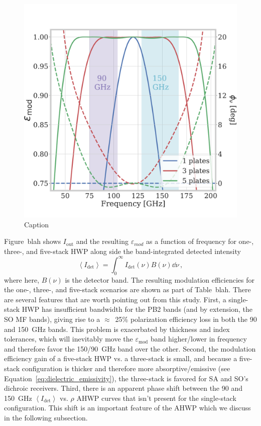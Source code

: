 \begin{figure}[!t]
    \centering
    \includegraphics[width=0.7\linewidth, trim=0cm 1cm 0cm 3cm, clip]{PolarizationModulation/Figures/one_three_five_plates_modulation_efficiency_phase.pdf}
    \caption{Caption}
    \label{fig:my_label}
\end{figure}

Figure~blah shows $I_{\mathrm{out}}$ and the resulting $\varepsilon_{mod}$ as a function of frequency for one-, three-, and five-stack HWP along side the band-integrated detected intensity
\begin{equation}
    \left< I_{\mathrm{det}} \right> = \int_{0}^{\infty} I_{\mathrm{det}}(\nu) B(\nu) \dd \nu \, ,
\end{equation}
where here, $B(\nu)$ is the detector band. The resulting modulation efficiencies for the one-, three-, and five-stack scenarios are shown as part of Table~blah. There are several features that are worth pointing out from this study. First, a single-stack HWP has insufficient bandwidth for the PB2 bands (and by extension, the SO MF bands), giving rise to a $\approx$~25\% polarization efficiency loss in both the 90 and 150~GHz bands. This problem is exacerbated by thickness and index tolerances, which will inevitably move the $\varepsilon_{\mathrm{mod}}$ band higher/lower in frequency and therefore favor the 150/90~GHz band over the other. Second, the modulation efficiency gain of a five-stack HWP vs. a three-stack is small, and because a five-stack configuration is thicker and therefore more absorptive/emissive (see Equation~\ref{eq:dielectric_emissivity}), the three-stack is favored for SA and SO's dichroic receivers. Third, there is an apparent phase shift between the 90 and 150~GHz $\left< I_{\mathrm{det}} \right>$ vs. $\rho$ AHWP curves that isn't present for the single-stack configuration. This shift is an important feature of the AHWP which we discuss in the following subsection.


